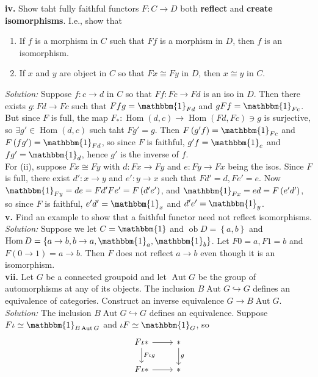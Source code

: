 \documentclass[a4paper]{article}
\theoremstyle{plain}%
\theoremstyle{definition}
\theoremstyle{remark}
\DeclareMathOperator{\ob}{ob}
\DeclareMathOperator{\Hom}{Hom}
\DeclareMathOperator{\Aut}{Aut}
\begin{document}
\textbf{iv.} Show taht fully faithful functors $F  \colon C \to D$ both
\textbf{reflect} and \textbf{create isomorphisms}. I.e., show that
\begin{enumerate}
    \item If $f$ is a morphism in $C$ such that $Ff$ is a morphism in $D$, then
        $f$ is an isomorphism.
    \item If $x$ and $y$ are object in $C$ so that $Fx \cong Fy$ in $D$, then
        $x \cong y$ in $C$.
\end{enumerate}
\textit{Solution:} Suppose $f  \colon c \to d$ in $C$ so that
$Ff  \colon Fc \to Fd$ is an iso in $D$. Then there exists
$g  \colon Fd \to Fc$ such that $Ff g = \mathbbm{1}_{Fd}$ and $g Ff
= \mathbbm{1}_{Fc}$. But since $F$ is full, the map
$F_*  \colon \Hom(d,c) \to \Hom(Fd, Fc) \ni g$ is surjective, so $\exists g'
\in 
\Hom(d,c)$ such taht $Fg' = g$. Then
$F \left( g' f \right) = \mathbbm{1}_{Fc}$ and
$F \left( f g' \right) = \mathbbm{1}_{Fd}$, so
since $F$ is faithful, $g'f = \mathbbm{1}_{c}$ and
$fg' = \mathbbm{1}_{d}$, hence $g'$ is the inverse of $f$.\\
\linebreak
For (ii), suppose $Fx \cong Fy$ with $d  \colon Fx \to Fy$ and $e  \colon Fy
\to Fx$ being the isos. Since $F$ is full, there exist
$d'  \colon x\to y$ and $e'  \colon y \to x$ such that
$Fd' = d, Fe' = e$. Now
$\mathbbm{1}_{Fy} = de = Fd' Fe' = F\left( d' e' \right)$, and
$\mathbbm{1}_{Fx} = ed = F\left( e' d' \right) $, so since
$F$ is faithful, $e'd' = \mathbbm{1}_x$ and
$d'e' = \mathbbm{1}_y$.\\
\linebreak
\textbf{v.} Find an example to show that a faithful functor need not reflect
isomorphisms.\\
\linebreak
\textit{Solution:} Suppose we let $C = \mathbbm{1}$ and
$\ob D = \left\{ a,b \right\} $ and $\Hom D = \left\{ a\to b, b\to a,
\mathbbm{1}_a, \mathbbm{1}_b \right\} $. Let
$F 0 = a, F 1 = b$ and $F \left( 0 \to 1 \right) = a\to b$. Then $F $ does not
reflect $a\to b$ even though it is an isomorphism.\\
\linebreak
\textbf{vii.} Let $G$ be a connected groupoid and let $\Aut G$ be the group of
automorphisms at any of its objects. The inclusion $B\Aut G \hookrightarrow G$
defines an equivalence of categories. Construct an inverse equivalence $G \to
B \Aut G$.\\
\linebreak
\textit{Solution:} The inclusion $B\Aut G \hookrightarrow G$ defines an
equivalence. Suppose
$F \iota \simeq \mathbbm{1}_{B \Aut G}$ and
$\iota F \simeq \mathbbm{1}_{G}$, so
\begin{equation*}
\begin{tikzcd}
    F \iota  * \ar[d, "F \iota g"] \ar[r] & * \ar[d, "g"]\\
    F \iota * \ar[r] & *
\end{tikzcd}
\end{equation*}
\end{document}
